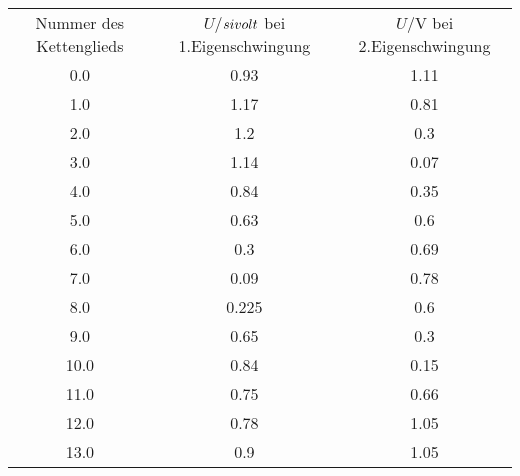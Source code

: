 \begin{table}
\begin{tabular}{ccc}
Nummer des Kettenglieds & $U$/$\\si{\\volt}$ bei 1.Eigenschwingung & $U$/$\si{\volt}$ bei 2.Eigenschwingung \\
0.0 & 0.93 & 1.11 \\
1.0 & 1.17 & 0.81 \\
2.0 & 1.2 & 0.3 \\
3.0 & 1.14 & 0.07 \\
4.0 & 0.84 & 0.35 \\
5.0 & 0.63 & 0.6 \\
6.0 & 0.3 & 0.69 \\
7.0 & 0.09 & 0.78 \\
8.0 & 0.225 & 0.6 \\
9.0 & 0.65 & 0.3 \\
10.0 & 0.84 & 0.15 \\
11.0 & 0.75 & 0.66 \\
12.0 & 0.78 & 1.05 \\
13.0 & 0.9 & 1.05 \\
\end{tabular}
\end{table}
